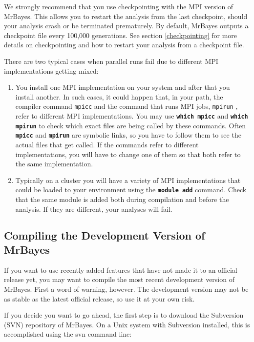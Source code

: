 \documentclass[12pt]{book}
\newcommand{\ttt}[1]{\texttt{#1} }
\newcommand{\tb}[1]{\texttt{\textbf{#1}} }
\begin{document}
We strongly recommend that you use checkpointing with the MPI version of MrBayes. This allows you
to restart the analysis from the last checkpoint, should your analysis crash or be terminated prematurely.
By default, MrBayes outputs a checkpoint file every 100,000 generations. See section \ref{checkpointing}
for more details on checkpointing and how to restart your analysis from a checkpoint file.

There are two typical cases when parallel runs fail due to different MPI implementations getting mixed:
 
\begin{enumerate}
\item You install one MPI implementation on your system and after that you install another. In such cases,
it could happen that, in your path, the compiler command \ttt{mpicc} and the command that runs MPI jobs,
\ttt{mpirun}, refer to different MPI implementations. You may use \tb{which mpicc} and \tb{which mpirun}
to check which exact files are being called by these commands. Often \tb{mpicc} and 
\tb{mpirun} are symbolic links, so you have to follow them to see the actual files that get called. If the
commands refer to different implementations, you will have to change one of them so that both refer
to the same implementation.
\item Typically on a cluster you will have a variety of MPI implementations that could be loaded to your
environment using the \tb{module add} command.  Check that the same module is added both during
compilation and before the analysis. If they are different, your analyses will fail.
\end{enumerate}

\subsection{Compiling the Development Version of MrBayes}
\label{compileDevVersion}

If you want to use recently added features that have not made it to an official release yet, you
may want to compile the most recent development version of MrBayes. First a word of warning,
however. The development version may not be as stable as the latest official release, so use it at
your own risk.

If you decide you want to go ahead, the first step is to download the Subversion (SVN) repository of MrBayes.
On a Unix system with Subversion installed, this is accomplished using the svn command line:
\end{document}
